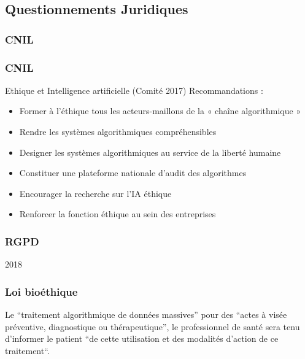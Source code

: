 \subsection{Questionnements Juridiques}

\begin{frame}
  \frametitle{CNIL}
\end{frame}

\begin{frame}
  \frametitle{CNIL}
  Ethique et Intelligence artificielle (Comité 2017)
  Recommandations :
  \begin{itemize}
  \item Former à l’éthique tous les acteurs-maillons de la « chaîne algorithmique » 
  \item Rendre les systèmes algorithmiques compréhensibles
  \item Designer les systèmes algorithmiques au service de la liberté humaine
  \item Constituer une plateforme nationale d’audit des algorithmes
  \item Encourager la recherche sur l’IA éthique
  \item Renforcer la fonction éthique au sein des entreprises
  \end{itemize}
\end{frame}

\begin{frame}
  \frametitle{RGPD}
  2018
\end{frame}

\begin{frame}
  \frametitle{Loi bioéthique}
  Le ``traitement algorithmique de données massives'' pour des ``actes à visée préventive, diagnostique ou thérapeutique'', le professionnel de santé sera tenu d'informer le patient ``de cette utilisation et des modalités d’action de ce traitement``.
\end{frame}
